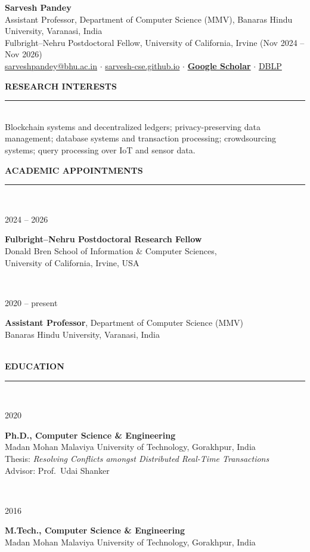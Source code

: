 \documentclass[11pt,a4paper]{article}
\newcommand{\cvsection}[1]{%
  \vspace{1.05em}%
  {\normalsize\bfseries\uppercase{#1}}\\[-0.55em]%
  \rule{\textwidth}{0.6pt}\\[0.35em]%
}
\newcommand{\cvrow}[2]{%
  \begin{minipage}[t]{0.145\textwidth}\raggedright\small\textcolor{black!62}{#1}\end{minipage}%
  \hfill%
  \begin{minipage}[t]{0.835\textwidth}#2\end{minipage}\\[0.5em]%
}
\begin{document}
\begin{center}
  {\LARGE\bfseries Sarvesh Pandey}\\[0.45em]
  {\small
    Assistant Professor, Department of Computer Science (MMV), Banaras Hindu University, Varanasi, India\\
    Fulbright--Nehru Postdoctoral Fellow, University of California, Irvine (Nov 2024 -- Nov 2026)\\[0.4em]
    \href{mailto:sarveshpandey@bhu.ac.in}{sarveshpandey@bhu.ac.in} \quad$\cdot$\quad
    \href{https://sarvesh-cse.github.io}{sarvesh-cse.github.io} \quad$\cdot$\quad
    \href{https://scholar.google.com/citations?user=eXeYCBgAAAAJ}{\textbf{Google Scholar}} \quad$\cdot$\quad
    \href{https://dblp.org/pid/211/7543.html}{DBLP}
  }
\end{center}

\cvsection{Research Interests}

Blockchain systems and decentralized ledgers; privacy-preserving data management;
database systems and transaction processing; crowdsourcing systems; query processing
over IoT and sensor data.

\cvsection{Academic Appointments}

\cvrow{2024 -- 2026}{
  \textbf{Fulbright--Nehru Postdoctoral Research Fellow}\\
  Donald Bren School of Information \& Computer Sciences,\\
  University of California, Irvine, USA \quad {\small(Host: Prof.\ Sharad Mehrotra)}
}

\cvrow{2020 -- present}{
  \textbf{Assistant Professor}, Department of Computer Science (MMV)\\
  Banaras Hindu University, Varanasi, India
}

\cvsection{Education}

\cvrow{2020}{
  \textbf{Ph.D., Computer Science \& Engineering}\\
  Madan Mohan Malaviya University of Technology, Gorakhpur, India\\
  {\small Thesis: \emph{Resolving Conflicts amongst Distributed Real-Time Transactions}}\\
  {\small Advisor: Prof.\ Udai Shanker}
}

\cvrow{2016}{
  \textbf{M.Tech., Computer Science \& Engineering}\\
  Madan Mohan Malaviya University of Technology, Gorakhpur, India
}
\end{document}
